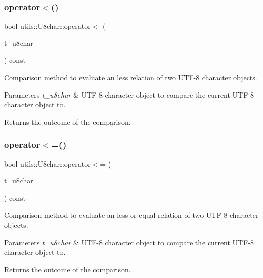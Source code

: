 \subsubsection{\texorpdfstring{operator$<$()}{operator<()}}
{\footnotesize\ttfamily bool utils\+::\+U8char\+::operator$<$ (\begin{DoxyParamCaption}\item[{\hyperlink{classutils_1_1U8char}{U8char} const \&}]{t\+\_\+u8char }\end{DoxyParamCaption}) const}

Comparison method to evaluate an \textquotesingle{}less\textquotesingle{} relation of two U\+T\+F-\/8 character objects. 
\begin{DoxyParams}{Parameters}
{\em t\+\_\+u8char} & U\+T\+F-\/8 character object to compare the current U\+T\+F-\/8 character object to. \\
\hline
\end{DoxyParams}
\begin{DoxyReturn}{Returns}
the outcome of the comparison. 
\end{DoxyReturn}
\mbox{\label{classutils_1_1U8char_aadba92f7615944b5a56e1c741b4e1d14}} 
\subsubsection{\texorpdfstring{operator$<$=()}{operator<=()}}
{\footnotesize\ttfamily bool utils\+::\+U8char\+::operator$<$= (\begin{DoxyParamCaption}\item[{\hyperlink{classutils_1_1U8char}{U8char} const \&}]{t\+\_\+u8char }\end{DoxyParamCaption}) const}

Comparison method to evaluate an \textquotesingle{}less or equal\textquotesingle{} relation of two U\+T\+F-\/8 character objects. 
\begin{DoxyParams}{Parameters}
{\em t\+\_\+u8char} & U\+T\+F-\/8 character object to compare the current U\+T\+F-\/8 character object to. \\
\hline
\end{DoxyParams}
\begin{DoxyReturn}{Returns}
the outcome of the comparison. 
\end{DoxyReturn}
\mbox{\label{classutils_1_1U8char_a469ba19fd42df808d0fc4927bb33d81b}} 

